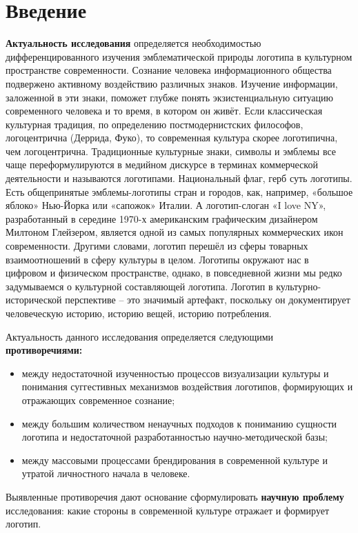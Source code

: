 \section*{Введение}

\textbf{Актуальность исследования} определяется необходимостью дифференцированного изучения эмблематической природы логотипа в культурном пространстве современности. Сознание человека информационного общества подвержено активному воздействию различных знаков. Изучение информации, заложенной в эти знаки, поможет глубже понять экзистенциальную ситуацию современного человека и то время, в котором он живёт. Если классическая культурная традиция, по определению постмодернистских философов, логоцентрична (Деррида, Фуко), то современная культура скорее логотипична, чем логоцентрична. Традиционные культурные знаки, символы и эмблемы все чаще переформулируются в медийном дискурсе в терминах коммерческой деятельности и называются логотипами. Национальный флаг, герб суть логотипы. Есть общепринятые эмблемы-логотипы стран и городов, как, например, «большое яблоко» Нью-Йорка или «сапожок» Италии. А логотип-слоган «I love NY», разработанный в середине 1970-х американским графическим дизайнером Милтоном Глейзером, является одной из самых популярных коммерческих икон современности. Другими словами, логотип перешёл из сферы товарных взаимоотношений в сферу культуры в целом. Логотипы окружают нас в цифровом и физическом пространстве, однако, в повседневной жизни мы редко задумываемся о культурной составляющей логотипа. Логотип в культурно-исторической перспективе – это значимый артефакт, поскольку он документирует человеческую историю, историю вещей, историю потребления.

Актуальность данного исследования определяется следующими \textbf{противоречиями:}
\begin{itemize}
\item между недостаточной изученностью процессов визуализации культуры и понимания суггестивных механизмов воздействия логотипов, формирующих и отражающих современное сознание;
\item между большим количеством ненаучных подходов к пониманию сущности логотипа и недостаточной разработанностью научно-методической базы;
\item между массовыми процессами брендирования в современной культуре и утратой личностного начала в человеке.
\end{itemize}

Выявленные противоречия дают основание сформулировать \textbf{научную проблему} исследования: какие стороны в современной культуре отражает и формирует логотип.

